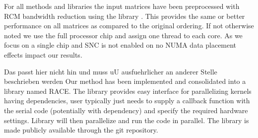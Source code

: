 For all methods and libraries the input matrices have been preprocessed with \acrshort{RCM} bandwidth reduction using the \SPMP library \cite{SpMP}. This provides the same or better performance on all matrices as compared to the original ordering. If not otherwise noted we use the full processor chip and assign one thread to each core. As we focus on a single chip and SNC is not enabled on \SKX no NUMA data placement effects impact our results.  



{\GW Das passt hier nicht hin und muss uU ausfuehrlicher an anderer Stelle beschrieben werden  Our method has been implemented and consolidated into a library named \acrshort{RACE}. The library provides easy interface for parallelizing kernels having dependencies, user typically just needs to supply a callback function with the serial code (potentially with dependency) and specify the required hardware settings. Library will then parallelize and run the code in parallel. The library is made publicly available through the git repository.}  %
 

